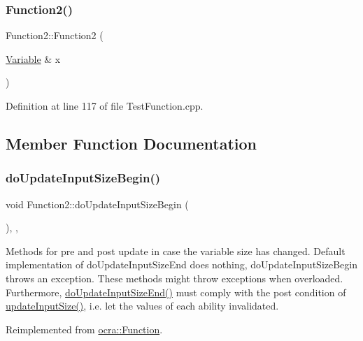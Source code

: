 \subsubsection{\texorpdfstring{Function2()}{Function2()}}
{\footnotesize\ttfamily Function2\+::\+Function2 (\begin{DoxyParamCaption}\item[{\hyperlink{classocra_1_1Variable}{Variable} \&}]{x }\end{DoxyParamCaption})\hspace{0.3cm}{\ttfamily [inline]}}



Definition at line 117 of file Test\+Function.\+cpp.



\subsection{Member Function Documentation}
\hypertarget{classFunction2_ab05887e9f8995782cdc3f9399c476c4e}{}\label{classFunction2_ab05887e9f8995782cdc3f9399c476c4e} 
\subsubsection{\texorpdfstring{do\+Update\+Input\+Size\+Begin()}{doUpdateInputSizeBegin()}}
{\footnotesize\ttfamily void Function2\+::do\+Update\+Input\+Size\+Begin (\begin{DoxyParamCaption}{ }\end{DoxyParamCaption})\hspace{0.3cm}{\ttfamily [inline]}, {\ttfamily [protected]}, {\ttfamily [virtual]}}

Methods for pre and post update in case the variable size has changed. Default implementation of do\+Update\+Input\+Size\+End does nothing, do\+Update\+Input\+Size\+Begin throws an exception. These methods might throw exceptions when overloaded. Furthermore, {\ttfamily \hyperlink{classFunction2_a6a875214e7fa8b07f064cd699ac29ff6}{do\+Update\+Input\+Size\+End()}} must comply with the post condition of {\ttfamily \hyperlink{classocra_1_1Function_a3a5b9e6ae296339acc87ab2cbf97ef98}{update\+Input\+Size()}}, i.\+e. let the values of each ability invalidated. 

Reimplemented from \hyperlink{classocra_1_1Function_a3f728f3758e6448aa59932853db5ddcc}{ocra\+::\+Function}.



